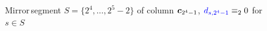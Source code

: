 
\begin{figure}[p]

    \noindent{}

    \captionsetup{singlelinecheck=off}
    \caption[\flqq Mirror\frqq\,segment of column $\vect{c}_{2^{4}-1}$ 
        in $\mathcal{C}_{\equiv_{2}}$]
        {\flqq Mirror\frqq\,segment $S=\lbrace2^{4},\ldots,2^{5}-2\rbrace$ of column $\vect{c}_{2^{4}-1}$,
        $\textcolor{blue}{d_{s,2^{4}-1}}\equiv_{2}0$ for $s\in S$}

    \label{fig:mirror-segment}

\end{figure}
